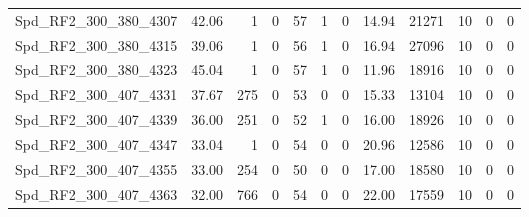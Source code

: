 \begin{longtable}[c]{@{}lrrrrrrrrrrr@{}}
Spd\_RF2\_300\_380\_4307     & 42.06                  & 1                       & 0                       & 57                     & 1                       & 0                       & 14.94                   & 21271                    & 10                       & 0                        & 0                        \\
Spd\_RF2\_300\_380\_4315     & 39.06                  & 1                       & 0                       & 56                     & 1                       & 0                       & 16.94                   & 27096                    & 10                       & 0                        & 0                        \\
Spd\_RF2\_300\_380\_4323     & 45.04                  & 1                       & 0                       & 57                     & 1                       & 0                       & 11.96                   & 18916                    & 10                       & 0                        & 0                        \\
Spd\_RF2\_300\_407\_4331     & 37.67                  & 275                     & 0                       & 53                     & 0                       & 0                       & 15.33                   & 13104                    & 10                       & 0                        & 0                        \\
Spd\_RF2\_300\_407\_4339     & 36.00                  & 251                     & 0                       & 52                     & 1                       & 0                       & 16.00                   & 18926                    & 10                       & 0                        & 0                        \\
Spd\_RF2\_300\_407\_4347     & 33.04                  & 1                       & 0                       & 54                     & 0                       & 0                       & 20.96                   & 12586                    & 10                       & 0                        & 0                        \\
Spd\_RF2\_300\_407\_4355     & 33.00                  & 254                     & 0                       & 50                     & 0                       & 0                       & 17.00                   & 18580                    & 10                       & 0                        & 0                        \\
Spd\_RF2\_300\_407\_4363     & 32.00                  & 766                     & 0                       & 54                     & 0                       & 0                       & 22.00                   & 17559                    & 10                       & 0                        & 0                        \\

\end{longtable}
